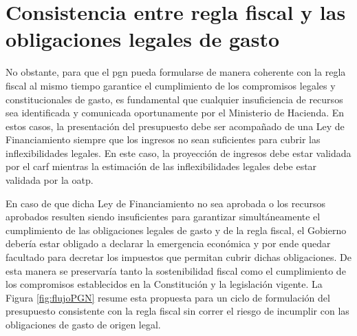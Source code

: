 \section{Consistencia entre regla fiscal y las obligaciones legales de gasto} 

No obstante, para que el \gls{pgn} pueda formularse de manera coherente con la regla fiscal al mismo tiempo garantice el cumplimiento de los compromisos legales y constitucionales de gasto, es fundamental que cualquier insuficiencia de recursos sea identificada y comunicada oportunamente por el Ministerio de Hacienda. En estos casos, la presentación del presupuesto debe ser acompañado de una Ley de Financiamiento siempre que los ingresos no sean suficientes para cubrir las inflexibilidades legales. En este caso, la proyección de ingresos debe estar validada por el \gls{carf} mientras la estimación de las inflexibilidades legales debe estar validada por la \gls{oatp}.


En caso de que dicha Ley de Financiamiento no sea aprobada o los recursos aprobados resulten siendo insuficientes para garantizar simultáneamente el cumplimiento de las obligaciones legales de gasto y de la regla fiscal, el Gobierno debería estar obligado a declarar la emergencia económica y por ende quedar facultado para decretar los impuestos que permitan cubrir dichas obligaciones. De esta manera se preservaría tanto la sostenibilidad fiscal como el cumplimiento de los compromisos establecidos en la Constitución y la legislación vigente. La Figura \ref{fig:flujoPGN} resume esta propuesta para un ciclo de formulación del presupuesto consistente con la regla fiscal sin correr el riesgo de incumplir con las obligaciones de gasto de origen legal.


